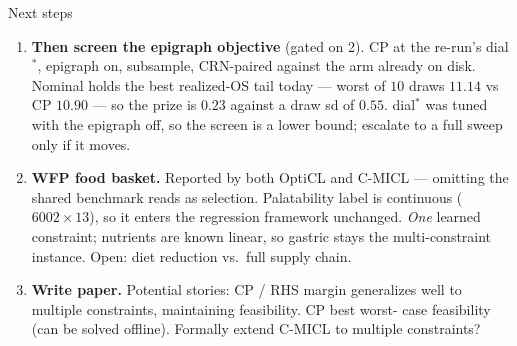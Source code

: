 \documentclass{beamer}
\begin{document}
\begin{frame}{Next steps}
    \footnotesize
    \begin{enumerate}
        \item \textbf{Then screen the epigraph objective} (gated on 2). CP at
              the re-run's dial$^\ast$, epigraph on, subsample, CRN-paired
              against the arm already on disk. Nominal holds the best
              realized-OS tail today --- worst of $10$ draws $11.14$ vs CP
              $10.90$ --- so the prize is $0.23$ against a draw sd of $0.55$.
              dial$^\ast$ was tuned with the epigraph off, so the screen is a
              lower bound; escalate to a full sweep only if it moves.
        \item \textbf{WFP food basket.} Reported by both OptiCL and C-MICL ---
              omitting the shared benchmark reads as selection. Palatability
              label is continuous ($6002 \times 13$), so it enters the regression
              framework unchanged. \emph{One} learned constraint; nutrients are
              known linear, so gastric stays the multi-constraint instance. Open:
              diet reduction vs.\ full supply chain.
        \item \textbf{Write paper.} Potential stories: CP / RHS margin generalizes
              well to multiple constraints, maintaining feasibility. CP best worst-
              case feasibility (can be solved offline). Formally extend C-MICL
              to multiple constraints?
    \end{enumerate}
\end{frame}
\end{document}
